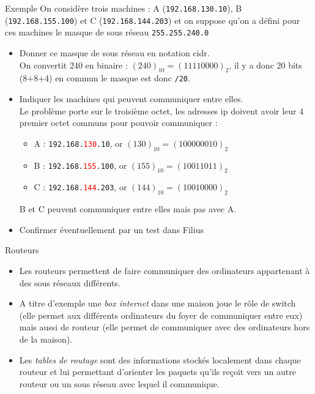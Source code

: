 \documentclass[10pt]{beamer}
\begin{document}
\begin{frame}
	\mframe{\Reseau}
	\begin{exampleblock}{Exemple}
		On considère trois machines : A ({\tt 192.168.130.10}), B ({\tt 192.168.155.100}) et C ({\tt 192.168.144.203}) et on suppose qu'on a défini pour ces machines le masque de sous réseau {\tt 255.255.240.0}
		\begin{itemize}
			\item<1-> Donner ce masque de sous réseau en notation {\sc cidr}. \\
			      \onslide<4-> \textcolor{OliveGreen}{On convertit 240 en binaire : $(240)_{10} = (11110000)_2$, il y a donc 20 bits (8+8+4) en commun le masque est donc {\tt /20}.}
			\item<2-> Indiquer les machines qui peuvent communiquer entre elles.\\
			      \onslide<5-> \textcolor{OliveGreen}{Le problème porte sur le troisième octet, les adresses {\sc ip} doivent avoir leur 4 premier octet communs pour pouvoir communiquer :}
			      \onslide<6-> \textcolor{OliveGreen}{\begin{itemize}
					      \item A : {\tt 192.168.\textcolor{red}{130}.10}, or $(130)_{10} = (100000010)_2$
					      \item B : {\tt 192.168.\textcolor{red}{155}.100}, or $(155)_{10} = (10011011)_2$
					      \item C : {\tt 192.168.\textcolor{red}{144}.203}, or $(144)_{10} = (10010000)_2$
				      \end{itemize}
				      \textcolor{OliveGreen} B et C peuvent communiquer entre elles mais pas avec A.}
			\item<3-> Confirmer éventuellement par un test dans Filius
		\end{itemize}
	\end{exampleblock}
\end{frame}



\begin{frame}
	\mframe{\Reseau}
	\begin{alertblock}{Routeurs}
		\begin{itemize}
			\item<1-> Les routeurs permettent de faire communiquer des ordinateurs appartenant à des sous réseaux différents.
			\item<2-> A titre d'exemple une \textit{box internet} dans une maison joue le rôle de switch (elle permet aux différents ordinateurs du foyer de communiquer entre eux) mais aussi de routeur (elle permet de communiquer avec des ordinateurs hors de la maison).
			\item<3-> Les \textit{tables de routage} sont des informations stockés localement dans chaque routeur et lui permettant d'orienter les paquets qu'ils reçoit vers un autre routeur ou un sous réseau avec lequel il communique.
		\end{itemize}
	\end{alertblock}
\end{frame}
\end{document}
